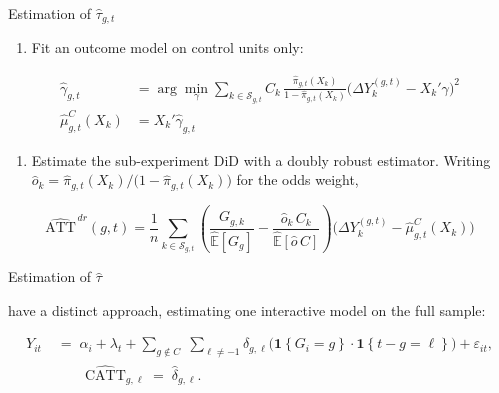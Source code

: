 \documentclass[11pt]{beamer}
\newcommand{\ind}[1]{\mathbf{1}\!\left\{#1\right\}}
\newcommand{\CATT}{\mathrm{CATT}}
\begin{document}
\begin{frame}{Estimation of $\hat{\tau}_{g,t}$}
    \begin{enumerate}
        \item[3.] Fit an outcome model on control units only:
    \end{enumerate}

    \vspace{-2mm}
    {\small
    \begin{align*}
      \hat\gamma_{g,t}
        &= \arg\min_{\gamma} \sum_{k \in \mathcal{S}_{g,t}}
           C_k \, \frac{\hat\pi_{g,t}(X_k)}{1 - \hat\pi_{g,t}(X_k)}
           \Big( \Delta Y_k^{(g,t)} - X_k'\gamma \Big)^{2} \\[1mm]
      \hat\mu^{C}_{g,t}(X_k) &= X_k'\hat\gamma_{g,t}
    \end{align*}
    }

    \vspace{1mm}
    \begin{enumerate}
        \item[4.] Estimate the sub-experiment DiD with a doubly robust estimator.
              Writing $\hat o_k = \hat\pi_{g,t}(X_k) / \big(1 - \hat\pi_{g,t}(X_k)\big)$
              for the odds weight,
    \end{enumerate}

    \vspace{-2mm}
    {\small
    \begin{equation*}
      \widehat{\text{ATT}}^{\,dr}(g,t)
      = \frac{1}{n} \sum_{k \in \mathcal{S}_{g,t}}
        \left( \frac{G_{g,k}}{\widehat{\mathbb{E}}[G_g]}
             - \frac{\hat o_k \, C_k}{\widehat{\mathbb{E}}[\hat o \, C]} \right)
        \Big( \Delta Y_k^{(g,t)} - \hat\mu^{C}_{g,t}(X_k) \Big)
    \end{equation*}
    }
\end{frame}

\begin{frame}{Estimation of $\hat{\tau}$}

\cite{sun2021estimating} have a distinct approach, estimating one interactive model on the full sample:

\begin{align*}
  Y_{it}
  \;&=\;
  \alpha_i + \lambda_t
  + \sum_{g \notin C} \; \sum_{\ell \neq -1}
    \delta_{g,\ell} \Big( \ind{G_i = g} \cdot \ind{t - g = \ell} \Big)
  + \varepsilon_{it}, \\
  &\qquad
  \widehat{\CATT}_{g,\ell} \;=\; \hat\delta_{g,\ell}.
\end{align*}

    
\end{frame}
\end{document}
